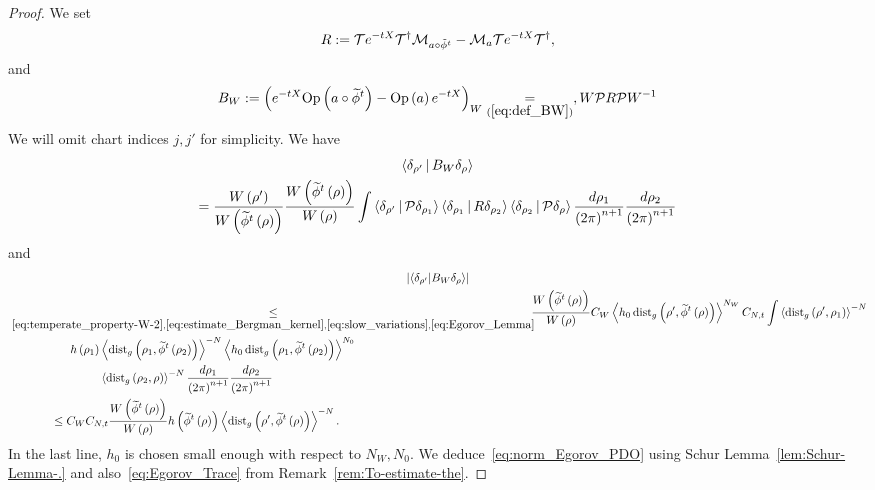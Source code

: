 \documentclass[10pt]{amsart}
\theoremstyle{definition}\newtheorem{defi}[theo]{Definition}\newtheorem{rema}[theo]{Remark}\newtheorem{exam}[theo]{Example}\newtheorem{exem}[theo]{Example}\newtheorem{nota}[theo]{Notation}
\newcommand*\eq[1]{\underset{(#1)}{=}}
\newcommand{\clT}{\mathcal{T}}
\newcommand{\clM}{\mathcal{M}}
\newcommand{\clP}{\mathcal{P}}
\newcommand{\dist}{\mathrm{dist}}
\newcommand{\Opp}{\mathrm{Op}}
\let\oldtilde\tilde
\renewcommand*{\tilde}[1]{\mathchoice{\widetilde{#1}}{\widetilde{#1}}{\oldtilde{#1}}{\oldtilde{#1}}}
\begin{document}
\begin{proof}
We set
\[
R:=\clT e^{-tX}\clT^{\dagger}\clM_{a\circ\tilde{\phi}^{t}}-\clM_{a}\clT e^{-tX}\clT^{\dagger},
\]
and
\[
B_{W}:=\left(e^{-tX}\Opp \left(a\circ\tilde{\phi}^{t}\right)-\Opp \left(a\right)e^{-tX}\right)_{W}\eq{\ref{eq:def_BW}}, W\clP R\clP W^{-1}
\]
We will omit chart indices $j,j'$ for simplicity. We have
\begin{multline*}
\left\langle\delta_{\rho'}\,\middle|\,B_{W}\delta_{\rho}\right\rangle \\
 =\frac{W\left(\rho'\right)}{W\left(\tilde{\phi}^{t}\left(\rho\right)\right)}\frac{W\left(\tilde{\phi}^{t}\left(\rho\right)\right)}{W\left(\rho\right)}\int\left\langle\delta_{\rho'}\,\middle|\,\clP \delta_{\rho_{1}}\right\rangle\left\langle\delta_{\rho_{1}}\,\middle|\,R\delta_{\rho_{2}}\right\rangle\left\langle\delta_{\rho_{2}}\,\middle|\,\clP \delta_{\rho}\right\rangle\frac{d\rho_{1}}{\left(2\pi\right)^{n+1}}\frac{d\rho_{2}}{\left(2\pi\right)^{n+1}}
\end{multline*}
and
\begin{multline*}
\left|\langle\delta_{\rho'}|B_{W}\delta_{\rho}\rangle\right|\\
\begin{aligned}
&\underset{\eqref{eq:temperate_property-W-2},\eqref{eq:estimate_Bergman_kernel},\eqref{eq:slow_variations},\eqref{eq:Egorov_Lemma}}{\leq}  \mkern-10mu\frac{W\left(\tilde{\phi}^{t}\left(\rho\right)\right)}{W\left(\rho\right)}C_{W}\left\langle h_{0}\,\dist_{g}\left(\rho',\tilde{\phi}^{t}\left(\rho\right)\right)\right\rangle ^{N_{W}}C_{N,t}\int\left\langle \dist_{g}\left(\rho',\rho_{1}\right)\right\rangle ^{-N}\\
&\mkern95mu h\left(\rho_{1}\right)\left\langle \dist_{g}\left(\rho_{1},\tilde{\phi}^{t}\left(\rho_{2}\right)\right)\right\rangle ^{-N}  \left\langle h_{0}\,\dist_{g}\left(\rho_{1},\tilde{\phi}^{t}\left(\rho_{2}\right)\right)\right\rangle ^{N_{0}}\\
&\mkern140mu \left\langle \dist_{g}\left(\rho_{2},\rho\right)\right\rangle ^{-N}\frac{d\rho_{1}}{\left(2\pi\right)^{n+1}}\frac{d\rho_{2}}{\left(2\pi\right)^{n+1}}\\
&\mkern65mu\leq C_{W} C_{N,t}\frac{W\left(\tilde{\phi}^{t}\left(\rho\right)\right)}{W\left(\rho\right)}h\left(\tilde{\phi}^{t}\left(\rho\right)\right)\left\langle \dist_{g}\left(\rho',\tilde{\phi}^{t}\left(\rho\right)\right)\right\rangle ^{-N}.
\end{aligned}
\end{multline*}
In the last line, $h_{0}$ is chosen small enough with respect to $N_{W},N_{0}$. We deduce~\eqref{eq:norm_Egorov_PDO} using Schur Lemma~\ref{lem:Schur-Lemma-.} and also~\eqref{eq:Egorov_Trace} from Remark~\ref{rem:To-estimate-the}.
\end{proof}
\end{document}

